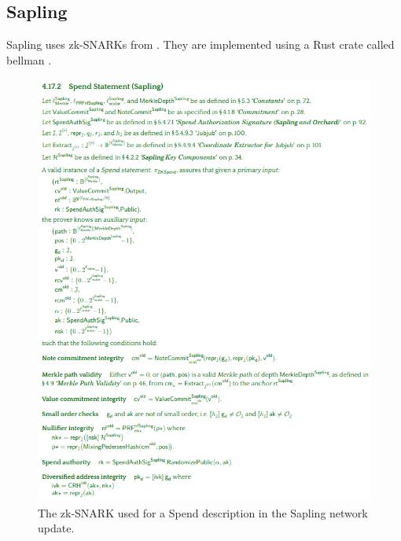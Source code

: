 \documentclass{article}
\begin{document}
\begin{enumerate}
\section{Sapling}

Sapling uses zk-SNARKs from \cite{groth:zksnark}. They are implemented using a Rust crate called bellman \cite{zcash:bellman}.

\begin{figure}[t]
\includegraphics[width=\textwidth]{spend-zksnark.png}
\caption{The zk-SNARK used for a Spend description in the Sapling network update. \cite{hopwood:zcash}}
\centering
\end{figure}


\end{enumerate}
\end{document}

